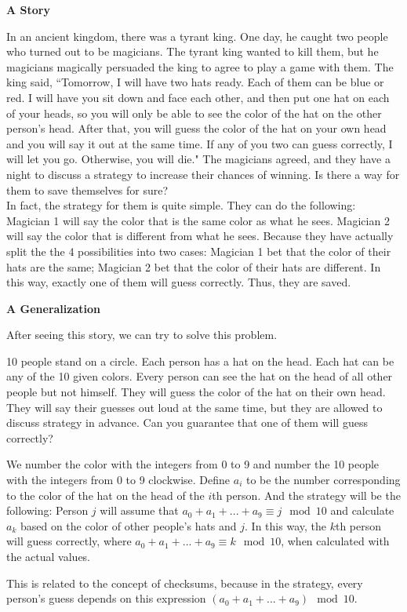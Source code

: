 
\noindent
\textbf{A Story}

	In an ancient kingdom, there was a tyrant king. One day, he caught two people who turned out to be magicians. The tyrant king wanted to kill them, but he magicians magically persuaded the king to agree to play a game with them. The king said, ``Tomorrow, I will have two hats ready. Each of them can be blue or red. I will have you sit down and face each other, and then put one hat on each of your heads, so you will only be able to see the color of the hat on the other person's head. After that, you will guess the color of the hat on your own head and you will say it out at the same time. If any of you two can guess correctly, I will let you go. Otherwise, you will die." The magicians agreed, and they have a night to discuss a strategy to increase their chances of winning. Is there a way for them to save themselves for sure?\\
	\indent In fact, the strategy for them is quite simple. They can do the following: Magician 1 will say the color that is the same color as what he sees. Magician 2 will say the color that is different from what he sees. Because they have actually split the the 4 possibilities into two cases: Magician 1 bet that the color of their hats are the same; Magician 2 bet that the color of their hats are different. In this way, exactly one of them will guess correctly. Thus, they are saved.

\noindent
\textbf{A Generalization}

	After seeing this story, we can try to solve this problem.
	\begin{problem}
		10 people stand on a circle. Each person has a hat on the head. Each hat can be any of the 10 given colors. Every person can see the hat on the head of all other people but not himself. They will guess the color of the hat on their own head. They will say their guesses out loud at the same time, but they are allowed to discuss strategy in advance. Can you guarantee that one of them will guess correctly?
	\end{problem}
	\begin{solution}	
		We number the color with the integers from 0 to 9 and number the 10 people with the integers from 0 to 9 clockwise. Define $a_i$ to be the number corresponding to the color of the hat on the head of the $i$th person. And the strategy will be the following: Person $j$ will assume that $a_0+a_1+...+a_9 \equiv j \mod 10$ and calculate $a_k$ based on the color of other people's hats and $j$. In this way, the $k$th person will guess correctly, where $a_0+a_1+...+a_9 \equiv k \mod 10$, when calculated with the actual values.
	\end{solution}
	This is related to the concept of checksums, because in the strategy, every person's guess depends on this expression $(a_0+a_1+...+a_9)\mod 10$.

